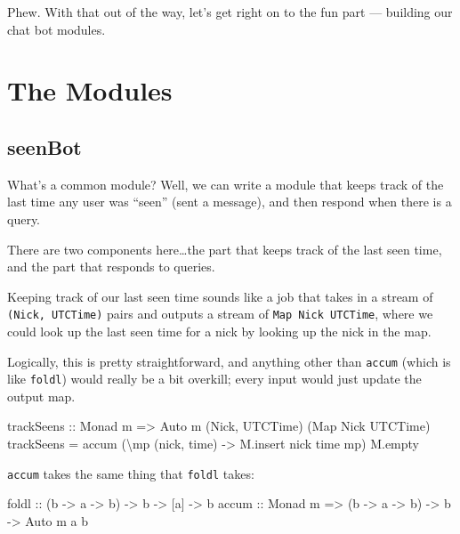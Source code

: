 \documentclass[]{article}
\newenvironment{Shaded}{}{}
\newcommand{\DataTypeTok}[1]{\textcolor[rgb]{0.56,0.13,0.00}{{#1}}}
\newcommand{\OtherTok}[1]{\textcolor[rgb]{0.00,0.44,0.13}{{#1}}}
\newcommand{\FunctionTok}[1]{\textcolor[rgb]{0.02,0.16,0.49}{{#1}}}
\newcommand{\NormalTok}[1]{{#1}}
\begin{document}
Phew. With that out of the way, let's get right on to the fun part ---
building our chat bot modules.

\section{The Modules}\label{the-modules}

\subsection{seenBot}\label{seenbot}

What's a common module? Well, we can write a module that keeps track of
the last time any user was ``seen'' (sent a message), and then respond
when there is a query.

There are two components here\ldots{}the part that keeps track of the
last seen time, and the part that responds to queries.

Keeping track of our last seen time sounds like a job that takes in a
stream of \texttt{(Nick,\ UTCTime)} pairs and outputs a stream of
\texttt{Map\ Nick\ UTCTime}, where we could look up the last seen time
for a nick by looking up the nick in the map.

Logically, this is pretty straightforward, and anything other than
\texttt{accum} (which is like \texttt{foldl\textquotesingle{}}) would
really be a bit overkill; every input would just update the output map.

\begin{Shaded}
\begin{Highlighting}[]
\OtherTok{trackSeens ::} \DataTypeTok{Monad} \NormalTok{m }\OtherTok{=>} \DataTypeTok{Auto} \NormalTok{m (}\DataTypeTok{Nick}\NormalTok{, }\DataTypeTok{UTCTime}\NormalTok{) (}\DataTypeTok{Map} \DataTypeTok{Nick} \DataTypeTok{UTCTime}\NormalTok{)}
\NormalTok{trackSeens }\FunctionTok{=} \NormalTok{accum (\textbackslash{}mp (nick, time) }\OtherTok{->} \NormalTok{M.insert nick time mp) M.empty}
\end{Highlighting}
\end{Shaded}

\texttt{accum} takes the same thing that \texttt{foldl} takes:

\begin{Shaded}
\begin{Highlighting}[]
\NormalTok{foldl}\OtherTok{ ::}            \NormalTok{(b }\OtherTok{->} \NormalTok{a }\OtherTok{->} \NormalTok{b) }\OtherTok{->} \NormalTok{b }\OtherTok{->} \NormalTok{[a] }\OtherTok{->} \NormalTok{b}
\OtherTok{accum ::} \DataTypeTok{Monad} \NormalTok{m }\OtherTok{=>} \NormalTok{(b }\OtherTok{->} \NormalTok{a }\OtherTok{->} \NormalTok{b) }\OtherTok{->} \NormalTok{b }\OtherTok{->} \DataTypeTok{Auto} \NormalTok{m a b}
\end{Highlighting}
\end{Shaded}
\end{document}
